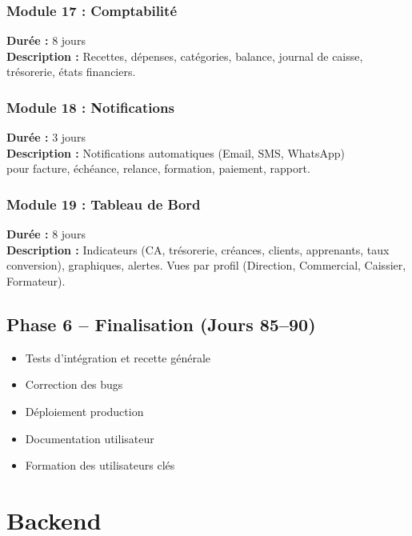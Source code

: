 \documentclass[12pt,a4paper]{report}
\begin{document}
\subsection*{Module 17 : Comptabilité}
\textbf{Durée :} 8 jours \\
\textbf{Description :} Recettes, dépenses, catégories, balance, journal de caisse, trésorerie, états financiers.

\subsection*{Module 18 : Notifications}
\textbf{Durée :} 3 jours \\
\textbf{Description :} Notifications automatiques (Email, SMS, WhatsApp) \\ pour facture, échéance, relance, formation, paiement, rapport.

\subsection*{Module 19 : Tableau de Bord}
\textbf{Durée :} 8 jours \\
\textbf{Description :} Indicateurs (CA, trésorerie, créances, clients, apprenants, taux conversion), graphiques, alertes. Vues par profil (Direction, Commercial, Caissier, Formateur).

\section{Phase 6 -- Finalisation (Jours 85--90)}
\label{sec:phase6}
\begin{itemize}
    \item Tests d'intégration et recette générale
    \item Correction des bugs
    \item Déploiement production
    \item Documentation utilisateur
    \item Formation des utilisateurs clés
\end{itemize}

\chapter{Backend}
\end{document}
